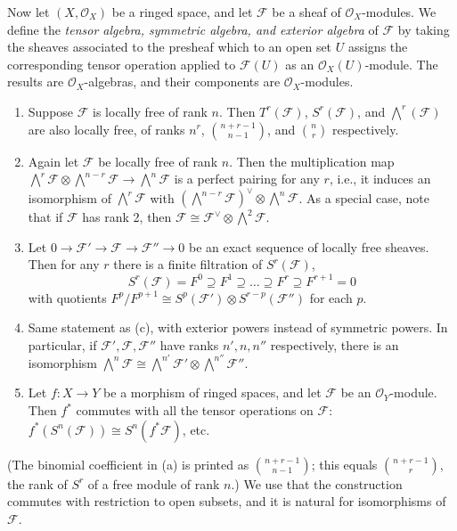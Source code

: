 \documentclass[11pt]{article}
\begin{document}
{Now let $(X,\mathcal O_X)$ be a ringed space, and let $\mathcal F$ be a sheaf of $\mathcal O_X$-modules. We define the \emph{tensor algebra, symmetric algebra, and exterior algebra} of $\mathcal F$ by taking the sheaves associated to the presheaf which to an open set $U$ assigns the corresponding tensor operation applied to $\mathcal F(U)$ as an $\mathcal O_X(U)$-module. The results are $\mathcal O_X$-algebras, and their components are $\mathcal O_X$-modules.
\begin{enumerate}[label=(\alph*),leftmargin=*]
\item Suppose $\mathcal F$ is locally free of rank $n$. Then $T^r(\mathcal F)$, $S^r(\mathcal F)$, and $\bigwedge^r(\mathcal F)$ are also locally free, of ranks $n^r$, $\binom{n+r-1}{n-1}$, and $\binom nr$ respectively.
\item Again let $\mathcal F$ be locally free of rank $n$. Then the multiplication map $\bigwedge^r\mathcal F\otimes\bigwedge^{n-r}\mathcal F\to\bigwedge^n\mathcal F$ is a perfect pairing for any $r$, i.e., it induces an isomorphism of $\bigwedge^r\mathcal F$ with $(\bigwedge^{n-r}\mathcal F)^\vee\otimes\bigwedge^n\mathcal F$. As a special case, note that if $\mathcal F$ has rank 2, then $\mathcal F\cong\mathcal F^\vee\otimes\bigwedge^2\mathcal F$.
\item Let $0\to\mathcal F'\to\mathcal F\to\mathcal F''\to0$ be an exact sequence of locally free sheaves. Then for any $r$ there is a finite filtration of $S^r(\mathcal F)$,
\[
S^r(\mathcal F)=F^0\supseteq F^1\supseteq\dots\supseteq F^r\supseteq F^{r+1}=0
\]
with quotients $F^p/F^{p+1}\cong S^p(\mathcal F')\otimes S^{r-p}(\mathcal F'')$ for each $p$.
\item Same statement as (c), with exterior powers instead of symmetric powers. In particular, if $\mathcal F',\mathcal F,\mathcal F''$ have ranks $n',n,n''$ respectively, there is an isomorphism $\bigwedge^n\mathcal F\cong\bigwedge^{n'}\mathcal F'\otimes\bigwedge^{n''}\mathcal F''$.
\item Let $f:X\to Y$ be a morphism of ringed spaces, and let $\mathcal F$ be an $\mathcal O_Y$-module. Then $f^*$ commutes with all the tensor operations on $\mathcal F$: $f^*(S^n(\mathcal F))\cong S^n(f^*\mathcal F)$, etc.
\end{enumerate}}
\pf
(The binomial coefficient in (a) is printed as $\binom{n+r-1}{n-1}$; this equals $\binom{n+r-1}{r}$, the rank of $S^r$ of a free module of rank $n$.) We use that the construction commutes with restriction to open subsets, and it is natural for isomorphisms of $\mathcal F$.
\end{document}
